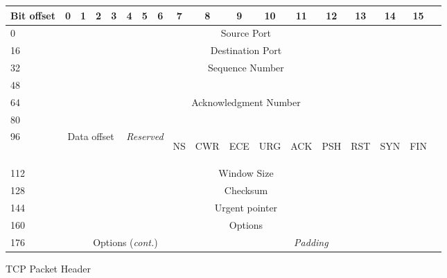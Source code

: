 \begin{figure}[h!]
\centering
\begin{tabular}{|l|c|c|c|c|c|c|c|c|c|c|c|c|c|c|c|c|c|}
\hline
Bit offset & 0 & 1 & 2 & 3 & 4 & 5 & 6 & 7 & 8 & 9 & 10 & 11 & 12 & 13 & 14 & 15 \\ \hline \hline
0 & \multicolumn{16}{|c|}{Source Port} \\ \hline
16 & \multicolumn{16}{|c|}{Destination Port} \\ \hline
32 & \multicolumn{16}{|c|}{\multirow{2}{*}{Sequence Number}} \\ \cline{1-1}
48 & \multicolumn{16}{|c|}{} \\ \hline
64 & \multicolumn{16}{|c|}{\multirow{2}{*}{Acknowledgment Number}} \\ \cline{1-1}
80 & \multicolumn{16}{|c|}{} \\ \hline
96 & \multicolumn{4}{|c|}{Data offset} & \multicolumn{3}{|c|}{\emph{Reserved}} & \begin{sideways}\parbox{10mm}{NS}\end{sideways} & \begin{sideways}\parbox{10mm}{CWR}\end{sideways} & \begin{sideways}\parbox{10mm}{ECE}\end{sideways} & \begin{sideways}\parbox{10mm}{URG}\end{sideways} & \begin{sideways}\parbox{10mm}{ACK}\end{sideways} & \begin{sideways}\parbox{10mm}{PSH}\end{sideways} & \begin{sideways}\parbox{10mm}{RST}\end{sideways} & \begin{sideways}\parbox{10mm}{SYN}\end{sideways} & \begin{sideways}\parbox{10mm}{FIN}\end{sideways} \\ \hline
112 & \multicolumn{16}{|c|}{Window Size} \\ \hline
128 & \multicolumn{16}{|c|}{Checksum} \\ \hline
144 & \multicolumn{16}{|c|}{Urgent pointer} \\ \hline \hline
160 & \multicolumn{16}{|c|}{Options} \\ \hline
176 & \multicolumn{8}{|c|}{Options (\emph{cont.})} & \multicolumn{8}{|c|}{\emph{Padding}}\\ \hline
\end{tabular}
\caption{TCP Packet Header}
\label{fig:tcpheader}
\end{figure}